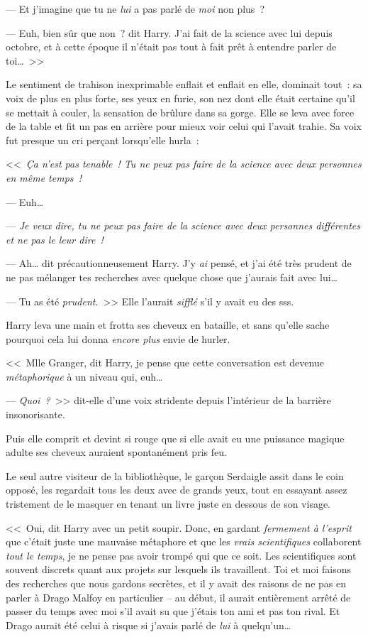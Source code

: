 --- Et j'imagine que tu ne \emph{lui} a pas parlé de \emph{moi} non plus~?

--- Euh, bien sûr que non~? dit Harry. J'ai fait de la science avec lui depuis octobre, et à cette époque il n'était pas tout à fait prêt à entendre parler de toi…~>>

Le sentiment de trahison inexprimable enflait et enflait en elle, dominait tout~: sa voix de plus en plus forte, ses yeux en furie, son nez dont elle était certaine qu'il se mettait à couler, la sensation de brûlure dans sa gorge. Elle se leva avec force de la table et fit un pas en arrière pour mieux voir celui qui l'avait trahie. Sa voix fut presque un cri perçant lorsqu'elle hurla~:

<<~\emph{Ça n'est pas tenable~! Tu ne peux pas faire de la science avec deux personnes en même temps~!}

--- Euh…

--- \emph{Je veux dire, tu ne peux pas faire de la science avec deux personnes différentes et ne pas le leur dire~!}

--- Ah… dit précautionneusement Harry. J'y \emph{ai} pensé, et j'ai été très prudent de ne pas mélanger tes recherches avec quelque chose que j'aurais fait avec lui…

--- Tu as été \emph{prudent}.~>> Elle l'aurait \emph{sifflé} s'il y avait eu des sss.

Harry leva une main et frotta ses cheveux en bataille, et sans qu'elle sache pourquoi cela lui donna \emph{encore plus} envie de hurler.

<<~Mlle Granger, dit Harry, je pense que cette conversation est devenue \emph{métaphorique} à un niveau qui, euh…

--- \emph{Quoi~?}~>> dit-elle d'une voix stridente depuis l'intérieur de la barrière insonorisante.

Puis elle comprit et devint si rouge que si elle avait eu une puissance magique adulte ses cheveux auraient spontanément pris feu.

Le seul autre visiteur de la bibliothèque, le garçon Serdaigle assit dans le coin opposé, les regardait tous les deux avec de grands yeux, tout en essayant assez tristement de le masquer en tenant un livre juste en dessous de son visage.

<<~Oui, dit Harry avec un petit soupir. Donc, en gardant \emph{fermement à l'esprit} que c'était juste une mauvaise métaphore et que les \emph{vrais scientifiques} collaborent \emph{tout le temps}, je ne pense pas avoir trompé qui que ce soit. Les scientifiques sont souvent discrets quant aux projets sur lesquels ils travaillent. Toi et moi faisons des recherches que nous gardons secrètes, et il y avait des raisons de ne pas en parler à Drago Malfoy en particulier -- au début, il aurait entièrement arrêté de passer du temps avec moi s'il avait su que j'étais ton ami et pas ton rival. Et Drago aurait été celui à risque si j'avais parlé de \emph{lui} à quelqu'un…

